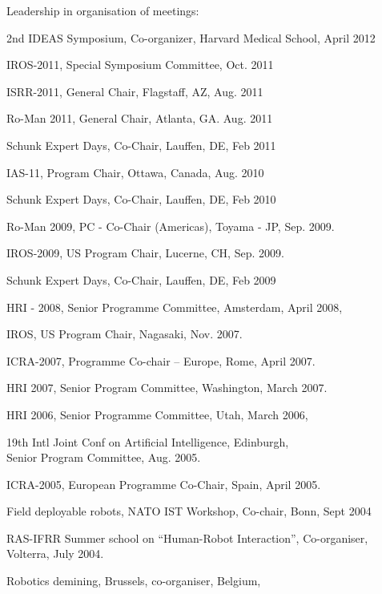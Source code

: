 \documentclass{article}
\begin{document}
\begin{cv}
\begin{cvlist}{Leadership in organisation of meetings:}
\item 2nd IDEAS Symposium, Co-organizer, Harvard Medical School,
  \cftdotfill{\cftdotsep} April 2012
\item IROS-2011, Special Symposium Committee, \cftdotfill{\cftdotsep}
  Oct. 2011
\item ISRR-2011, General Chair, Flagstaff, AZ, \cftdotfill{\cftdotsep}
  Aug. 2011
\item Ro-Man 2011, General Chair, Atlanta, GA.
  \cftdotfill{\cftdotsep} Aug. 2011
\item Schunk Expert Days, Co-Chair, Lauffen, DE,
  \cftdotfill{\cftdotsep} Feb 2011
\item IAS-11, Program Chair, Ottawa, Canada, \cftdotfill{\cftdotsep}
  Aug. 2010
\item Schunk Expert Days, Co-Chair, Lauffen, DE,
  \cftdotfill{\cftdotsep} Feb 2010
\item Ro-Man 2009, PC - Co-Chair (Americas), Toyama - JP,
  \cftdotfill{\cftdotsep} Sep.  2009.
\item IROS-2009, US Program Chair, Lucerne, CH,
  \cftdotfill{\cftdotsep} Sep. 2009.
\item Schunk Expert Days, Co-Chair, Lauffen, DE,
  \cftdotfill{\cftdotsep} Feb 2009
\item HRI - 2008, Senior Programme Committee, Amsterdam,
  \cftdotfill{\cftdotsep} April 2008,
\item IROS, US Program Chair, Nagasaki, \cftdotfill{\cftdotsep}
  Nov. 2007.
\item ICRA-2007, Programme Co-chair -- Europe, Rome,
  \cftdotfill{\cftdotsep} April 2007.
\item HRI 2007, Senior Program Committee, Washington,
  \cftdotfill{\cftdotsep} March 2007.
\item HRI 2006, Senior Programme Committee, Utah,
  \cftdotfill{\cftdotsep} March 2006,
\item 19th Intl Joint Conf on Artificial Intelligence,
  Edinburgh,\\ Senior Program Committee, \cftdotfill{\cftdotsep}
  Aug. 2005.
\item ICRA-2005, European Programme Co-Chair, Spain,
  \cftdotfill{\cftdotsep} April 2005.
\item Field deployable robots, NATO IST Workshop, Co-chair, Bonn,
  \cftdotfill{\cftdotsep} Sept 2004
\item RAS-IFRR Summer school on ``Human-Robot Interaction'',
  Co-organiser, \\Volterra, \cftdotfill{\cftdotsep} July 2004.
\item Robotics demining, Brussels, co-organiser, Belgium,

\end{cvlist}
\end{cv}
\end{document}
